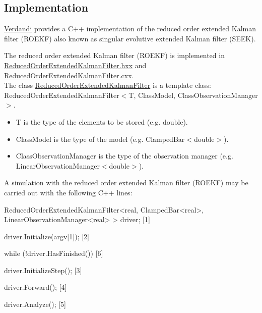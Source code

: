 \documentclass{tufte-book}
\begin{document}
 \hypertarget{reduced_order_extended_kalman_filter_implementation}{}\subsection{\-Implementation}\label{reduced_order_extended_kalman_filter_implementation}


 \hyperlink{namespace_verdandi}{\-Verdandi} provides a \-C++ implementation of the reduced order extended \-Kalman filter (\-R\-O\-E\-K\-F) also known as singular evolutive extended \-Kalman filter (\-S\-E\-E\-K).

\-The reduced order extended \-Kalman filter (\-R\-O\-E\-K\-F) is implemented in {\ttfamily \hyperlink{_reduced_order_extended_kalman_filter_8hxx_source}{\-Reduced\-Order\-Extended\-Kalman\-Filter.\-hxx}} and {\ttfamily \hyperlink{_reduced_order_extended_kalman_filter_8cxx_source}{\-Reduced\-Order\-Extended\-Kalman\-Filter.\-cxx}}.\\
 \-The class {\ttfamily  \hyperlink{class_verdandi_1_1_reduced_order_extended_kalman_filter}{\-Reduced\-Order\-Extended\-Kalman\-Filter}} is a template class\-: \\
 {\ttfamily \-Reduced\-Order\-Extended\-Kalman\-Filter$<$\-T, Class\-Model, Class\-Observation\-Manager$>$}.
 \begin{itemize}
  \item {\ttfamily \-T} is the type of the elements to be stored (e.\-g. {\ttfamily double}).
  \item {\ttfamily \-Class\-Model} is the type of the model (e.\-g. {\ttfamily \-Clamped\-Bar$<$double$>$}).
  \item {\ttfamily \-Class\-Observation\-Manager} is the type of the observation manager (e.\-g. {\ttfamily \-Linear\-Observation\-Manager$<$double$>$}).
  \end{itemize}

\-A simulation with the reduced order extended \-Kalman filter (\-R\-O\-E\-K\-F) may be carried out with the following \-C++ lines\-:

 \begin{frame_cpp}
ReducedOrderExtendedKalmanFilter<real, ClampedBar<real>,
        LinearObservationManager<real> > driver; [1]

driver.Initialize(argv[1]); [2]

while (!driver.HasFinished()) [6]
{
    driver.InitializeStep(); [3]

    driver.Forward(); [4]

    driver.Analyze(); [5]
}
\end{frame_cpp}
\end{document}
